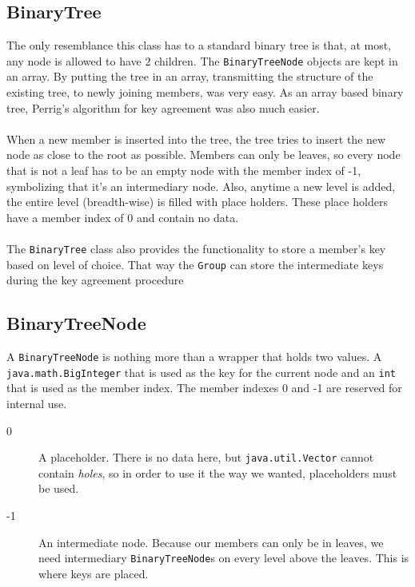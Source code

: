 \documentclass[12pt]{article}
\newcommand{\code}[1]{\texttt{#1}}
\begin{document}
        \subsection{BinaryTree}
        \label{xref:binarytree}
	 The only resemblance this class has to a standard binary tree is that,
	 at most, any node is allowed to have 2 children.  The 
	 \code{BinaryTreeNode} objects are kept in an array.  By putting
	 the tree in an array, transmitting the structure of the existing tree, 
	 to newly joining members, was very easy.  As an array based
	 binary tree, Perrig's algorithm for key agreement was also much 
	 easier.\\
	 \\
	 When a new member is inserted into the tree, the tree tries to insert 
	 the new node as close to the root as possible.  Members can only be 
	 leaves, so every node that is not a leaf has to be an empty node with
	 the member index of -1, symbolizing that it's an intermediary node.
	 Also, anytime a new level is added, the entire level (breadth-wise) is
	 filled with place holders.  These place holders have a member index
	 of 0 and contain no data.\\
	 \\
	 The \code{BinaryTree} class also provides the functionality to store
	 a member's key based on level of choice.  That way the \code{Group}
	 can store the intermediate keys during the key agreement procedure

        \subsection{BinaryTreeNode}
        \label{xref:binarytreenode}
	 A \code{BinaryTreeNode} is nothing more than a wrapper that holds two
	 values.  A \\\code{java.math.BigInteger} that is used as the key for 
	 the current node and an \code{int} that is used as the member index.
	 The member indexes 0 and -1 are reserved for internal use.
	 \begin{description}
	   \item[0]	A placeholder.  There is no data here, but 
			\code{java.util.Vector} cannot contain \textit{holes}, 
			so in order to use it the way we wanted, placeholders 
			must be used.
	   \item[-1]    An intermediate node.  Because our members can only
			be in leaves, we need intermediary 
			\code{BinaryTreeNode}s on every level above the leaves.
			This is where keys are placed.  
	 \end{description}
\end{document}
